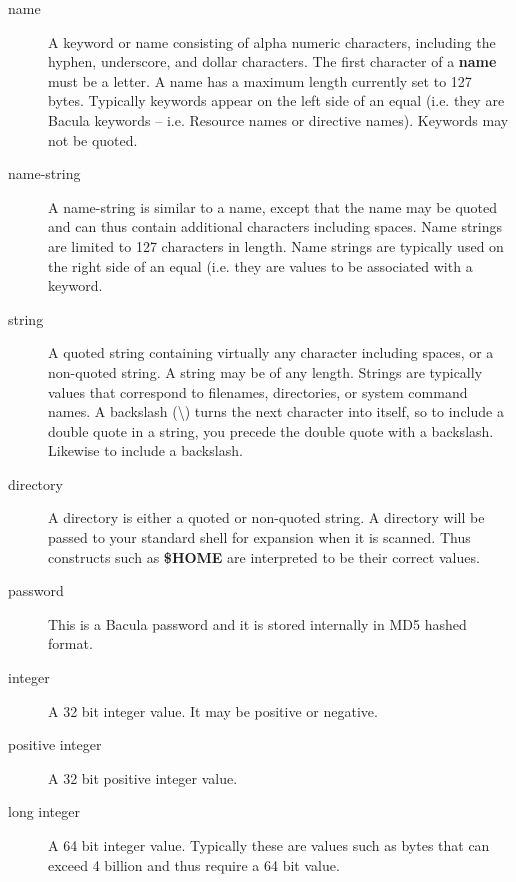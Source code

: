 \begin{description}

\item [name]
   A keyword or name consisting of alpha  numeric characters, including the
hyphen, underscore, and dollar  characters. The first character of a {\bf
name} must be  a letter.  A name has a maximum length currently set to 127
bytes.  Typically keywords appear on the left side of an equal (i.e.  they are
Bacula keywords -- i.e. Resource names or  directive names). Keywords may not
be quoted.  

\item [name-string]
   A name-string is similar to a name,  except that the name may be quoted and
can thus contain  additional characters including spaces. Name strings  are
limited to 127 characters in length. Name strings  are typically used on the
right side of an equal (i.e.  they are values to be associated with a keyword.


\item [string]
   A quoted string containing virtually any  character including spaces, or a
non-quoted string. A  string may be of any length. Strings are typically
values  that correspond to filenames, directories, or system  command names. A
backslash (\textbackslash{}) turns the next character into  itself, so to
include a double quote in a string, you precede the  double quote with a
backslash. Likewise to include a backslash. 

\item [directory]
   A directory is either a quoted or  non-quoted string. A directory will be
passed to your  standard shell for expansion when it is scanned. Thus 
constructs such as {\bf \$HOME} are interpreted to be  their correct values. 

\item [password]
   This is a Bacula password and  it is stored internally in MD5 hashed format. 

\item [integer]
   A 32 bit integer value. It may be positive  or negative. 

\item [positive integer]
   A 32 bit positive integer value. 

\item [long integer]
   A 64 bit integer value. Typically these  are values such as bytes that can
exceed 4 billion and thus  require a 64 bit value. 


\end{description}
